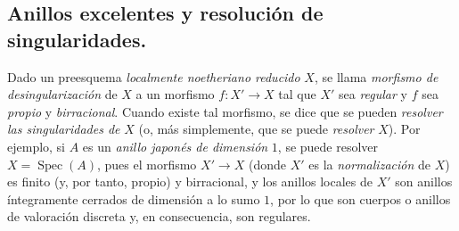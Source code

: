 \subsection{Anillos excelentes y resolución de singularidades.}
\label{subsection:IV.2.7.9-fr}

\begin{env}[7.9.1]
\label{IV.2.s7.9.1-fr}
Dado un preesquema \emph{localmente noetheriano reducido} $X$, se llama
\emph{morfismo de desingularización} de $X$ a un morfismo $f:X'\to X$
tal que $X'$ sea \emph{regular} y $f$ sea \emph{propio} y \emph{birracional}.
Cuando existe tal morfismo, se dice que se pueden \emph{resolver las
singularidades de} $X$ (o, más simplemente, que se puede \emph{resolver}
$X$). Por ejemplo, si $A$ es un \emph{anillo japonés de dimensión} $1$,
se puede resolver $X=\operatorname{Spec}(A)$, pues el morfismo $X'\to X$
(donde $X'$ es la \emph{normalización} de $X$) es finito (y, por tanto,
propio) y birracional, y los anillos locales de $X'$ son anillos
íntegramente cerrados de dimensión a lo sumo $1$, por lo que son cuerpos o anillos de
valoración discreta y, en consecuencia, son regulares.
\end{env}
